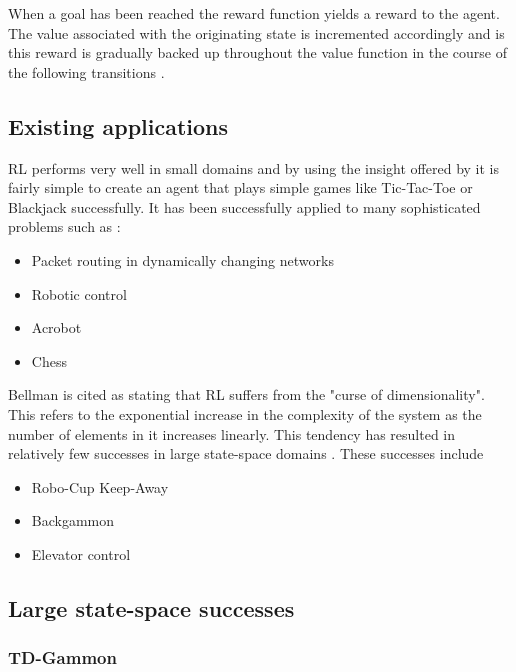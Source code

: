 \documentclass{rucsthesis}
\begin{document}
When a goal has been reached the reward function yields a reward to the agent.  The value  associated with the originating state is incremented accordingly and is this reward is gradually backed up throughout the value function in the course of the following transitions \citep{suttonbarto}.


\subsection{Existing applications}

RL performs very well in small domains and by using the insight offered by \cite{suttonbarto} it is fairly simple to create an agent that plays simple games like Tic-Tac-Toe or Blackjack successfully. It has been successfully applied to many sophisticated problems such as :

\begin{itemize}
\item{Packet routing in dynamically changing networks \citep{boyan94packet}}
\item{Robotic control \citep{rlrobotics}}
\item{Acrobot \citep{suttonbarto} }
\item{Chess \citep{baxter98knightcap}}
\end{itemize}

Bellman is cited \citep{suttonbarto} as stating that RL suffers from the "curse of dimensionality".  This refers to the exponential increase in the complexity of the system as the number of elements in it increases linearly. This tendency has resulted in relatively few successes in large state-space domains \citep{keepaway}. These successes include 

\begin{itemize}
\item{Robo-Cup Keep-Away \citep{keepaway}}
\item{Backgammon \citep{tdgammon}}
\item{Elevator control \citep{elevator}}
\end{itemize}

\subsection{Large state-space successes}

\subsubsection{TD-Gammon}
\end{document}
